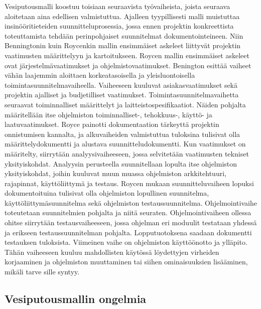 \documentclass[finnish,12pt]{tktltiki2}
\theoremstyle{definition}
\theoremstyle{remark}
\begin{document}
Vesiputousmalli koostuu toisiaan seuraavista työvaiheista, joista seuraava aloitetaan aina edellisen valmistuttua. Ajalleen tyypillisesti malli muistuttaa insinööritieteiden suunnitteluprosessia, jossa ennen projektin konkreettista toteuttamista tehdään perinpohjaiset suunnitelmat dokumentointeineen. Niin Benningtonin kuin Roycenkin mallin ensimmäiset askeleet liittyvät projektin vaatimusten määrittelyyn ja kartoitukseen. Roycen mallin ensimmäiset askeleet ovat järjestelmävaatimukset ja ohjelmistovaatimukset\cite{Royce1970}. Benington esittää vaiheet vähän laajemmin aloittaen korkeatasoisella ja yleisluontoisella toimintasuunnitelmavaiheella. Vaiheeseen kuuluvat asiakasvaatimukset sekä projektin ajalliset ja budjetilliset vaatimukset. Toimintasuunnitelmavaihetta seuraavat toiminnalliset määrittelyt ja laitteistospesifikaatiot. \cite{Benington:1987:PLC:41765.41799} Näiden pohjalta määritellään itse ohjelmiston toiminnalliset-, tehokkuus-, käyttö- ja laatuvaatimukset. Royce painotti dokumentaation tärkeyttä projektin onnistumisen kannalta, ja alkuvaiheiden valmistuttua tuloksina tulisivat olla määrittelydokumentti ja alustava suunnitteludokumentti. Kun vaatimukset on määritelty, siirrytään analyysivaiheeseen, jossa selvitetään vaatimusten tekniset yksityiskohdat. Analyysin perusteella suunnitellaan lopulta itse ohjelmiston yksityiskohdat, joihin kuuluvat muun muassa ohjelmiston arkkitehtuuri, rajapinnat, käyttöliittymä ja testaus. Roycen mukaan suunnitteluvaiheen lopuksi dokumentoituina tulisivat olla ohjelmiston lopullinen suunnitelma, käyttöliittymäsuunnitelma sekä ohjelmiston testaussuunnitelma. Ohjelmointivaihe toteutetaan suunnitelmien pohjalta ja niitä seuraten. Ohjelmointivaiheen ollessa ohitse siirrytään testausvaiheeseen, jossa ohjelman eri moduulit testataan yhdessä ja erikseen testaussuunnitelman pohjalta. Lopputuotoksena saadaan dokumentti testauksen tuloksista. Viimeinen vaihe on ohjelmiston käyttöönotto ja ylläpito. Tähän vaiheeseen kuuluu mahdollisten käytössä löydettyjen virheiden korjaaminen ja ohjelmiston muuttaminen tai siihen ominaisuuksien lisääminen, mikäli tarve sille syntyy.

\subsection{Vesiputousmallin ongelmia}
\end{document}
